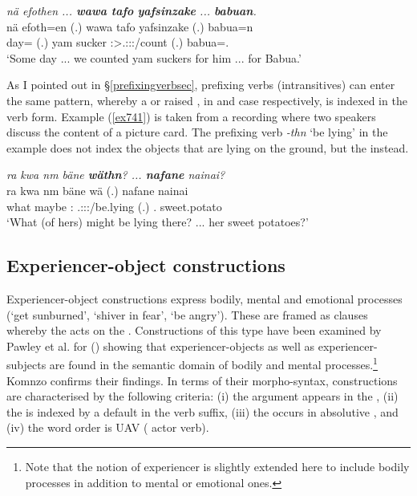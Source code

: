 \begin{exe}
	\ex \emph{nä efothen ... \textbf{wawa tafo} \textbf{yafsinzake} ... \textbf{babuan}.}\\
	\gll nä efoth=en (.) wawa tafo ya{fsi}nzake (.) babua=n\\
	{\Indf} day={\Loc} (.) yam sucker \Fpl:\Sbj>\Tsg.\Masc:\Io:\Pst:\Ipfv/count (.) babua=\Dat.{\Sg}\\
	\trans `Some day ... we counted yam suckers for him ... for Babua.'\\
	\label{ex577}
\end{exe}

As I pointed out in {\S}\ref{prefixingverbsec}, prefixing verbs (intransitives) can enter the same pattern, whereby a  or raised , in  and  case respectively, is indexed in the verb form. Example (\ref{ex741}) is taken from a recording where two speakers discuss the content of a picture card. The prefixing verb \emph{-thn} `be lying' in the example does not index the objects that are lying on the ground, but the  instead.

\begin{exe}
	\ex \emph{ra kwa nm bäne \textbf{wäthn}? ... \textbf{nafane} nainai?}\\
	\gll ra kwa nm bäne wä (.) nafane nainai\\
	what {\Fut} maybe \Dem:\Med{} \Tsg.\F:\Io:\Nonpast:\Ipfv/be.lying (.) \Tsg.{\Poss} sweet.potato\\
	\trans `What (of hers) might be lying there? ... her sweet potatoes?'
	\label{ex741}
\end{exe}

\subsection{Experiencer-object constructions}\label{expobjconstr}

Experiencer-object constructions express bodily, mental and emotional processes (`get sunburned', `shiver in fear', `be angry'). These are framed as  clauses whereby the  acts on the . Constructions of this type have been examined by Pawley et al. for  (\citeyear{Pawley:2000vp}) showing that experiencer-objects as well as experiencer-subjects are found in the semantic domain of bodily and mental processes.\footnote{Note that the notion of experiencer is slightly extended here to include bodily processes in addition to mental or emotional ones.} Komnzo confirms their findings. In terms of their morpho-syntax,  constructions are characterised by the following criteria: (i) the  argument appears in the , (ii) the  is indexed by a default \Tsg{} in the verb suffix, (iii) the  occurs in absolutive , and (iv) the word order is UAV ( actor verb).

